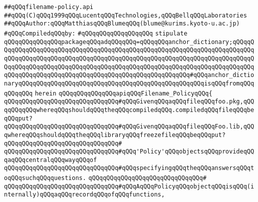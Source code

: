 \label{src/app/makelib/main/filename-policy.api}
\verb|##qQQqfilename-policy.api|\newline
\verb|##qQQq(C)qQQq1999qQQqLucentqQQqTechnologies,qQQqBellqQQqLaboratories|\newline
\verb|##qQQqAuthor:qQQqMatthiasqQQqBlumeqQQq(blume@kurims.kyoto-u.ac.jp)|\newline
\newline
\verb|#qQQqCompiledqQQqby:|\newline
\verb|#qQQqqQQqqQQqqQQqqQQq|\newline
\newline
\newline
\verb|stipulate|\newline
\verb|qQQqqQQqqQQqqQQqpackageqQQqadqQQqqQQq=qQQqqQQqanchor_dictionary;qQQqqQQqqQQqqQQqqQQqqQQqqQQqqQQqqQQqqQQqqQQqqQQqqQQqqQQqqQQqqQQqqQQqqQQqqQQqqQQqqQQqqQQqqQQqqQQqqQQqqQQqqQQqqQQqqQQqqQQqqQQqqQQqqQQqqQQqqQQqqQQqqQQqqQQqqQQqqQQqqQQqqQQqqQQqqQQqqQQqqQQqqQQqqQQqqQQqqQQqqQQqqQQqqQQqqQQqqQQqqQQqqQQqqQQqqQQqqQQqqQQqqQQqqQQqqQQqqQQqqQQqqQQq#qQQqanchor_dictionaryqQQqqQQqqQQqqQQqqQQqqQQqqQQqqQQqqQQqqQQqqQQqqQQqqQQqisqQQqfromqQQqqQQqqQQq|\newline
\verb|herein|\newline
\newline
\verb|qQQqqQQqqQQqqQQqapiqQQqFilename_PolicyqQQq{|\newline
\newline
\verb|qQQqqQQqqQQqqQQqqQQqqQQqqQQqqQQq#qQQqGivenqQQqaqQQqfileqQQqfoo.pkg,qQQqqQQqqQQqwhereqQQqshouldqQQqtheqQQqcompiledqQQq.compiledqQQqfileqQQqbeqQQqput?|\newline
\verb|qQQqqQQqqQQqqQQqqQQqqQQqqQQqqQQq#qQQqGivenqQQqaqQQqfileqQQqFoo.lib,qQQqwhereqQQqshouldqQQqtheqQQqlibraryqQQqfreezefileqQQqbeqQQqput?|\newline
\verb|qQQqqQQqqQQqqQQqqQQqqQQqqQQqqQQq#|\newline
\verb|qQQqqQQqqQQqqQQqqQQqqQQqqQQqqQQq#qQQq'Policy'qQQqobjectsqQQqprovideqQQqaqQQqcentralqQQqwayqQQqof|\newline
\verb|qQQqqQQqqQQqqQQqqQQqqQQqqQQqqQQq#qQQqspecifyingqQQqtheqQQqanswersqQQqtoqQQqsuchqQQqquestions.|\newline
\verb|qQQqqQQqqQQqqQQqqQQqqQQqqQQqqQQq#|\newline
\verb|qQQqqQQqqQQqqQQqqQQqqQQqqQQqqQQq#qQQqAqQQqPolicyqQQqobjectqQQqisqQQq(internally)qQQqaqQQqrecordqQQqofqQQqfunctions,|\newline
